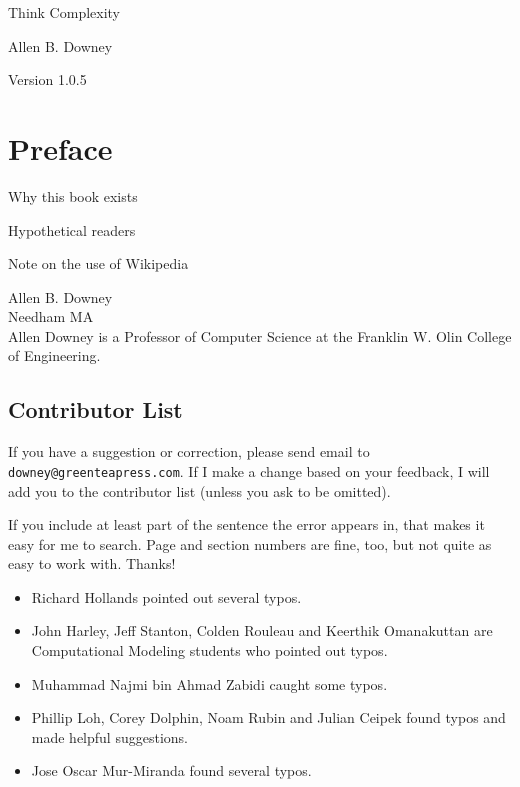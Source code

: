 \documentclass[10pt]{book}
\newcommand{\thetitle}{Think Complexity}
\newcommand{\theversion}{1.0.5}
\begin{document}

\begin{htmlonly}


{\Large \thetitle}

{\large Allen B. Downey}

Version \theversion

\setcounter{chapter}{-1}

\end{htmlonly}

\fi

\chapter{Preface}

Why this book exists

Hypothetical readers

Note on the use of Wikipedia

Allen B. Downey \\
Needham MA\\

Allen Downey is a Professor of Computer Science at
the Franklin W. Olin College of Engineering.



\section*{Contributor List}


If you have a suggestion or correction, please send email to
{\tt downey@greenteapress.com}.  If I make a change based on your
feedback, I will add you to the contributor list
(unless you ask to be omitted).

If you include at least part of the sentence the
error appears in, that makes it easy for me to search.  Page and
section numbers are fine, too, but not quite as easy to work with.
Thanks!

\small

\begin{itemize}

\item Richard Hollands pointed out several typos.

\item John Harley, Jeff Stanton, Colden Rouleau and
Keerthik Omanakuttan are Computational Modeling students who
pointed out typos.

\item Muhammad Najmi bin Ahmad Zabidi caught some typos.

\item Phillip Loh, Corey Dolphin, Noam Rubin and Julian Ceipek
found typos and made helpful suggestions.

\item Jose Oscar Mur-Miranda found several typos.


\end{itemize}
\end{document}
